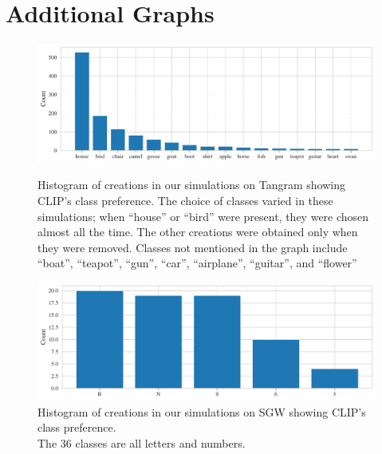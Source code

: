\chapter{Additional Graphs}
\label{sec:additional-graphs}

\begin{figure}[h]
    \centering
    \includegraphics[width=\textwidth]{images/creations_distribution.pdf}
    \vspace{-12pt}
    \caption[Histogram of creations in our simulations on Tangram showing CLIP's class preference.]{Histogram of creations in our simulations on Tangram showing CLIP's class preference. The choice of classes varied in these simulations; when ``house'' or ``bird'' were present, they were chosen almost all the time. The other creations were obtained only when they were removed. Classes not mentioned in the graph include ``boat'', ``teapot'', ``gun'', ``car'', ``airplane'', ``guitar'', and ``flower''}
    \label{fig:class-preference-tangram}
    \vspace{12pt}
    \includegraphics[width=\textwidth]{images/creations_distribution_sgw.pdf}
    \vspace{-12pt}
    \captionsetup{justification=centering}
    \caption[Histogram of creations in our simulations on SGW showing CLIP's class preference.]{Histogram of creations in our simulations on SGW showing CLIP's class preference.\\The \(36\) classes are all letters and numbers.}
    \label{fig:class-preference-sgw}
\end{figure}

